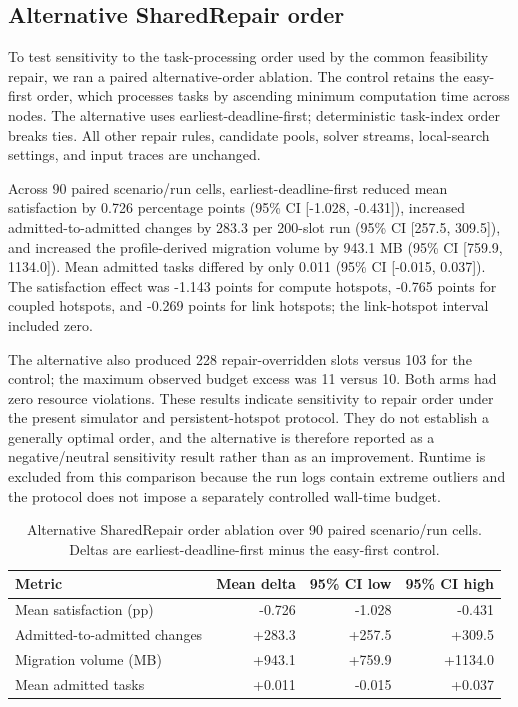 \documentclass[preprint,12pt]{elsarticle}
\begin{document}
\subsection{Alternative SharedRepair order}
\label{alternative-repair-order}

To test sensitivity to the task-processing order used by the common feasibility repair, we ran a paired alternative-order ablation. The control retains the easy-first order, which processes tasks by ascending minimum computation time across nodes. The alternative uses earliest-deadline-first; deterministic task-index order breaks ties. All other repair rules, candidate pools, solver streams, local-search settings, and input traces are unchanged.

Across 90 paired scenario/run cells, earliest-deadline-first reduced mean satisfaction by 0.726 percentage points (95\% CI [-1.028, -0.431]), increased admitted-to-admitted changes by 283.3 per 200-slot run (95\% CI [257.5, 309.5]), and increased the profile-derived migration volume by 943.1 MB (95\% CI [759.9, 1134.0]). Mean admitted tasks differed by only 0.011 (95\% CI [-0.015, 0.037]). The satisfaction effect was -1.143 points for compute hotspots, -0.765 points for coupled hotspots, and -0.269 points for link hotspots; the link-hotspot interval included zero.

The alternative also produced 228 repair-overridden slots versus 103 for the control; the maximum observed budget excess was 11 versus 10. Both arms had zero resource violations. These results indicate sensitivity to repair order under the present simulator and persistent-hotspot protocol. They do not establish a generally optimal order, and the alternative is therefore reported as a negative/neutral sensitivity result rather than as an improvement. Runtime is excluded from this comparison because the run logs contain extreme outliers and the protocol does not impose a separately controlled wall-time budget.

\begin{table}[H]
\centering
\caption{Alternative SharedRepair order ablation over 90 paired scenario/run cells. Deltas are earliest-deadline-first minus the easy-first control.}
\label{tab:alternative-repair}
\scriptsize
\begin{tabular}{lrrr}
\toprule
Metric & Mean delta & 95\% CI low & 95\% CI high \\
\midrule
Mean satisfaction (pp) & -0.726 & -1.028 & -0.431 \\
Admitted-to-admitted changes & +283.3 & +257.5 & +309.5 \\
Migration volume (MB) & +943.1 & +759.9 & +1134.0 \\
Mean admitted tasks & +0.011 & -0.015 & +0.037 \\
\bottomrule
\end{tabular}
\end{table}
\end{document}

